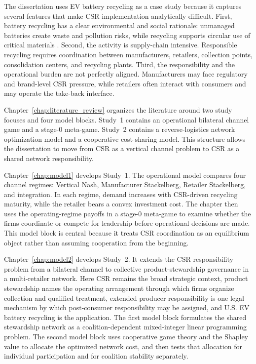 The dissertation uses EV battery recycling as a case study because it captures several features that make CSR implementation analytically difficult. First, battery recycling has a clear environmental and social rationale: unmanaged batteries create waste and pollution risks, while recycling supports circular use of critical materials \citep{Harper2019, tembo2024lithium, rezaei2025review}. Second, the activity is supply-chain intensive. Responsible recycling requires coordination between manufacturers, retailers, collection points, consolidation centers, and recycling plants. Third, the responsibility and the operational burden are not perfectly aligned. Manufacturers may face regulatory and brand-level CSR pressure, while retailers often interact with consumers and may operate the take-back interface.

Chapter~\ref{chap:literature_review} organizes the literature around two study focuses and four model blocks. Study~1 contains an operational bilateral channel game and a stage-0 meta-game. Study~2 contains a reverse-logistics network optimization model and a cooperative cost-sharing model. This structure allows the dissertation to move from CSR as a vertical channel problem to CSR as a shared network responsibility.

Chapter~\ref{chap:model1} develops Study~1. The operational model compares four channel regimes: Vertical Nash, Manufacturer Stackelberg, Retailer Stackelberg, and integration. In each regime, demand increases with CSR-driven recycling maturity, while the retailer bears a convex investment cost. The chapter then uses the operating-regime payoffs in a stage-0 meta-game to examine whether the firms coordinate or compete for leadership before operational decisions are made. This model block is central because it treats CSR coordination as an equilibrium object rather than assuming cooperation from the beginning.

Chapter~\ref{chap:model2} develops Study~2. It extends the CSR responsibility problem from a bilateral channel to collective product-stewardship governance in a multi-retailer network. Here CSR remains the broad strategic context, product stewardship names the operating arrangement through which firms organize collection and qualified treatment, extended producer responsibility is one legal mechanism by which post-consumer responsibility may be assigned, and U.S. EV battery recycling is the application. The first model block formulates the shared stewardship network as a coalition-dependent mixed-integer linear programming problem. The second model block uses cooperative game theory and the Shapley value to allocate the optimized network cost, and then tests that allocation for individual participation and for coalition stability separately.

